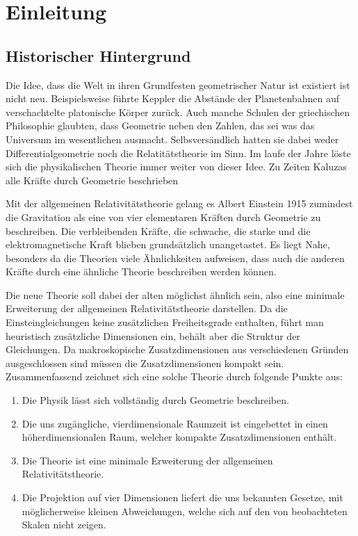 \chapter{Einleitung}
\section{Historischer Hintergrund}
Die Idee, dass die Welt in ihren Grundfesten geometrischer Natur ist
existiert ist nicht neu.
Beispielsweise führte Keppler die Abstände der Planetenbahnen auf
verschachtelte platonische Körper zurück. Auch manche Schulen der griechischen
Philosophie glaubten, dass Geometrie neben den Zahlen, das sei was das Universum
im wesentlichen ausmacht.
Selbsversändlich hatten sie dabei weder Differentialgeometrie noch die 
Relatitätstheorie im Sinn.  
Im laufe der Jahre löste sich die physikalischen Theorie immer weiter von dieser Idee. 
Zu Zeiten Kaluzas alle Kräfte durch Geometrie beschrieben
 

Mit der allgemeinen Relativitätstheorie gelang es Albert Einstein 1915
zumindest die Gravitation als eine von vier elementaren Kräften durch Geometrie
zu beschreiben. Die verbleibenden Kräfte, die schwache, die starke und die elektromagnetische Kraft
blieben grundsätzlich unangetastet. Es liegt Nahe, besonders da die Theorien
viele Ähnlichkeiten aufweisen, dass auch die anderen Kräfte durch eine ähnliche
Theorie beschreiben werden können.

Die neue Theorie soll dabei der alten 
möglichst ähnlich sein, also eine minimale Erweiterung der allgemeinen
Relativitätstheorie darstellen.
Da die Einsteingleichungen keine
zusätzlichen Freiheitsgrade enthalten, führt man heuristisch zusätzliche
Dimensionen ein, behält aber die Struktur der Gleichungen.
Da makroskopische Zusatzdimensionen aus verschiedenen Gründen ausgeschlossen
sind müssen die Zusatzdimensionen kompakt sein.
Zusammenfassend zeichnet sich eine solche Theorie durch folgende Punkte aus:
\begin{enumerate}
\item Die Physik lässt sich vollständig durch Geometrie beschreiben.
\item Die uns zugängliche, vierdimensionale Raumzeit ist eingebettet in einen
höherdimensionalen Raum, welcher kompakte Zusatzdimensionen enthält.
\item Die Theorie ist eine minimale Erweiterung der allgemeinen
Relativitätstheorie.
\item Die Projektion auf vier Dimensionen liefert die uns bekannten Gesetze, mit
möglicherweise kleinen Abweichungen, welche sich auf den von beobachteten Skalen
nicht zeigen.
\end{enumerate}
